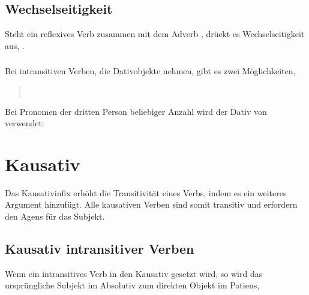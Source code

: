 \subsection{Wechselseitigkeit} Steht ein reflexives Verb zusammen mit dem Adverb  , drückt es Wechselseitigkeit aus,  .

\subsubsection{} Bei intransitiven Verben, die Dativobjekte nehmen, gibt es zwei Möglichkeiten,

\begin{quotation}
	\noindent{}  \\
	\noindent{} 
\end{quotation}

\noindent Bei Pronomen der dritten Person beliebiger Anzahl wird der Dativ von  verwendet:

\begin{quotation}
	\noindent{} 
\end{quotation}

\noindent {}

\section{Kausativ}
\noindent Das Kausativinfix  erhöht die Transitivität eines Verbs, indem es ein weiteres Argument hinzufügt. Alle kausativen Verben sind somit transitiv und erfordern den Agens für das Subjekt.
\label{syn:causative}

\subsection{Kausativ intransitiver Verben} Wenn ein intransitives Verb in den Kausativ gesetzt wird, so wird das ursprüngliche Subjekt im Absolutiv zum direkten Objekt im Patiens,

